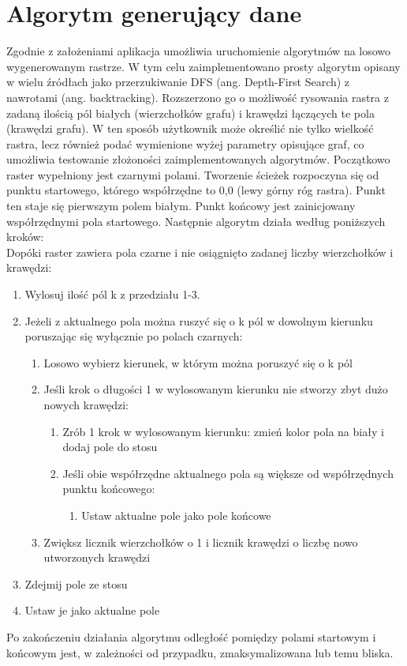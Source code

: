 \documentclass[11pt,a4paper]{article}
\begin{document}
\section{Algorytm generujący dane}
Zgodnie z założeniami aplikacja umożliwia uruchomienie algorytmów na losowo wygenerowanym
rastrze. W tym celu zaimplementowano prosty algorytm opisany w wielu źródłach jako
przerzukiwanie DFS (ang. Depth-First Search) z nawrotami (ang. backtracking). Rozszerzono
go o możliwość rysowania rastra z zadaną ilością pól białych (wierzchołków grafu) i krawędzi
łączących te pola (krawędzi grafu). W ten sposób użytkownik może określić nie tylko wielkość
rastra, lecz również podać wymienione wyżej parametry opisujące graf, co umożliwia testowanie
złożoności zaimplementowanych algorytmów.
Początkowo raster wypełniony jest czarnymi polami. Tworzenie ścieżek rozpoczyna się od punktu
startowego, którego współrzędne to 0,0 (lewy górny róg rastra). Punkt ten staje się pierwszym 
polem białym. Punkt końcowy jest zainicjowany współrzędnymi pola startowego. Następnie algorytm
działa według poniższych kroków:\\

Dopóki raster zawiera pola czarne i nie osiągnięto zadanej liczby wierzchołków i krawędzi:
\begin{enumerate}
\item Wylosuj ilość pól k z przedziału 1-3.
\item Jeżeli z aktualnego pola można ruszyć się o k pól w dowolnym kierunku poruszając się wyłącznie po polach czarnych:
	\begin{enumerate}[label*=\arabic*.]
	\item Losowo wybierz kierunek, w którym można poruszyć się o k pól
	\item Jeśli krok o długości 1 w wylosowanym kierunku nie stworzy zbyt dużo nowych krawędzi:
		\begin{enumerate}[label*=\arabic*.]
		\item Zrób 1 krok w wylosowanym kierunku: zmień kolor pola na biały i dodaj pole do stosu
		\item Jeśli obie współrzędne aktualnego pola są większe od współrzędnych punktu końcowego:
				\begin{enumerate}[label*=\arabic*.]
				\item Ustaw aktualne pole jako pole końcowe
				\end{enumerate}
		\end{enumerate}
	\item Zwiększ licznik wierzchołków o 1 i licznik krawędzi o liczbę nowo utworzonych krawędzi
	\end{enumerate}
\item Zdejmij pole ze stosu
\item Ustaw je jako aktualne pole
\end{enumerate}
Po zakończeniu działania algorytmu odległość pomiędzy polami startowym i końcowym jest, w zależności od
przypadku, zmaksymalizowana lub temu bliska.
\end{document}
